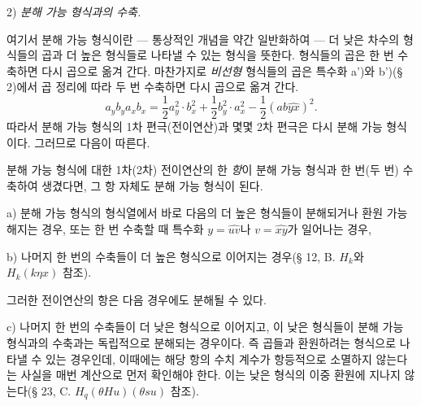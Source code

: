 
2) \emph{분해 가능 형식과의 수축.}

여기서 \glqq{}분해 가능 형식\grqq{}이란 --- 통상적인 개념을 약간 일반화하여 --- 더 낮은 차수의 형식들의 곱과 \glqq{}더 높은\grqq{} 형식들로 나타낼 수 있는 형식을 뜻한다. 형식들의 곱은 한 번 수축하면 다시 곱으로 옮겨 간다. 마찬가지로 \emph{비선형} 형식들의 곱은 특수화 a')와 b')(§ 2)에서 곱 정리에 따라 두 번 수축하면 다시 곱으로 옮겨 간다.
\[
a_yb_y a_xb_x=\frac12a_y^2\cdot b_x^2+\frac12b_y^2\cdot a_x^2-\frac12(ab\widehat{yx})^2.
\]
따라서 분해 가능 형식의 1차 편극(전이연산)과 몇몇 2차 편극은 다시 분해 가능 형식이다. 그러므로 다음이 따른다.

분해 가능 형식에 대한 1차(2차) 전이연산의 한 \emph{항}이 분해 가능 형식과 한 번(두 번) 수축하여 생겼다면, 그 항 자체도 분해 가능 형식이 된다.

a) 분해 가능 형식의 형식열에서 바로 다음의 더 높은 형식들이 분해되거나 환원 가능해지는 경우, 또는 한 번 수축할 때 특수화 $y=\widehat{uv}$나 $v=\widehat{xy}$가 일어나는 경우,

b) 나머지 한 번의 수축들이 더 높은 형식으로 이어지는 경우(§ 12, B. $H_k$와 $H_k(k\eta x)$ 참조).

그러한 전이연산의 항은 다음 경우에도 분해될 수 있다.

c) 나머지 한 번의 수축들이 더 낮은 형식으로 이어지고, 이 낮은 형식들이 분해 가능 형식과의 수축과는 독립적으로 분해되는 경우이다. 즉 곱들과 환원하려는 형식으로 나타낼 수 있는 경우인데, 이때에는 해당 항의 수치 계수가 항등적으로 소멸하지 않는다는 사실을 매번 계산으로 먼저 확인해야 한다. 이는 낮은 형식의 \glqq{}이중 환원\grqq{}에 지나지 않는다(§ 23, C. $H_q(\theta H u)(\theta s u)$ 참조).
